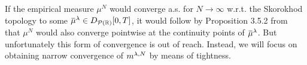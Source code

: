 If the empirical measure \(\mu^N\) would converge a.s. for \( N\to\infty \) w.r.t. the Skorokhod topology to some \( \ol{\mu}^\lambda \in D_{\cP(\potspace)}[0,T] \), it would follow by Proposition 3.5.2 from~\cite{ethierMarkovProcessesCharacterization1985} that \(\mu^N\) would also converge pointwise at the continuity points of \( \ol{\mu}^\lambda \).
But unfortunately this form of convergence is out of reach.  %
Instead, we will focus on obtaining narrow convergence of \(m^{\lambda,N}\) by means of tightness.
